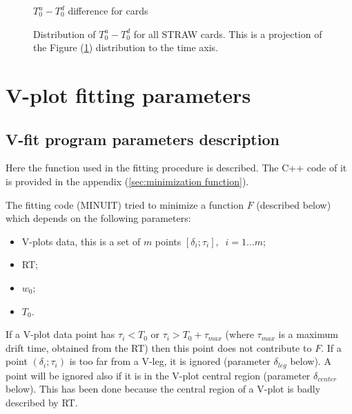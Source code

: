 \documentclass[a4paper,12pt]{article}
\begin{document}

\begin{figure}[ht]
\centering
\caption{$T_0^u - T_0^d$ difference for cards}
\label{T0u-T0d distr}
\epsfxsize=250pt 
\end{figure}
\begin{figure}[hb]
\centering
\caption{Distribution of $T_0^u - T_0^d$ for all STRAW cards.
This is a projection of the Figure (\ref{T0u-T0d distr}) distribution to the time axis.}
\label{T0u-T0d distr proj}
\epsfxsize=250pt 
\end{figure}

\clearpage
\section{V-plot fitting parameters}
\subsection{V-fit program parameters description}
\label{sec:V-fit parameters}
Here the function used in the fitting procedure is described.
The C++ code of it is provided in the appendix (\ref{sec:minimization function}).

The fitting code (MINUIT) tried to minimize a function $F$ (described below)
which depends on the following parameters:
\begin{itemize}
\item V-plots data, this is a set of $m$ points $[\delta_i;\tau_i],\;\;i=1\dots m$;
\item RT;
\item $w_0$;
\item $T_0$.
\end{itemize}

If a V-plot data point has $\tau_i<T_0$ or $\tau_i>T_0+\tau_{max}$ (where $\tau_{max}$ is a
maximum drift time, obtained from the RT) then this point does not contribute to $F$. If a point
$(\delta_i;\tau_i)$ is too far from a V-leg, it is ignored (parameter $\delta_{leg}$ below).
A point will be ignored also if it is in the V-plot central region (parameter $\delta_{center}$ below).
This has been done because the central region of a V-plot is badly described by RT.
\end{document}
